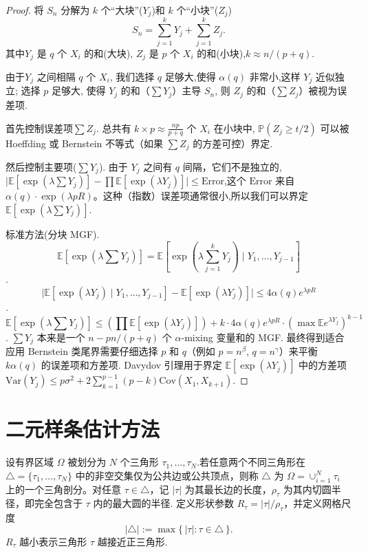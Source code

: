 \documentclass[a4paper,openay,14pt]{ctexbook}
\numberwithin{equation}{section}
\numberwithin{lem}{section}
\begin{document}
\begin{proof}
  
将 $S_n$ 分解为 $k$ 个“大块”($Y_j$)和 $k$ 个“小块”($Z_j$)
    \[
        S_n = \sum_{j=1}^k Y_j + \sum_{j=1}^k Z_j.
    \]
其中$Y_j$ 是 $q$ 个 $X_i$ 的和(大块), $Z_j$ 是 $p$ 个 $X_i$ 的和(小块),$k \approx n/(p+q)$.

由于$Y_j$ 之间相隔 $q$ 个 $X_i$, 我们选择 $q$ 足够大,使得 $\alpha(q)$ 非常小,这样 $Y_j$ 近似独立; 选择 $p$ 足够大, 使得 $Y_j$ 的和（$\sum Y_j$）主导 $S_n$, 则 $Z_j$ 的和（$\sum Z_j$）被视为误差项.

首先控制误差项$\sum Z_j$. 总共有 $k\times p \approx \frac{np}{p+q}$ 个 $X_i$ 在小块中, $\mathbb{P}(Z_j \ge t/2)$ 可以被 Hoeffding 或 Bernstein 不等式（如果 $\sum Z_j$ 的方差可控）界定.

然后控制主要项($\sum Y_j$). 由于 $Y_j$ 之间有 $q$ 间隔，它们不是独立的,$\bigl|\mathbb{E}[\exp(\lambda \sum Y_j)] - \prod \mathbb{E}[\exp(\lambda Y_j)] \bigr| \le \mathrm{Error}$,这个 $\mathrm{Error}$ 来自 $\alpha(q)\cdot \exp(\lambda p R)$。这种（指数）误差项通常很小,所以我们可以界定$\mathbb{E}[\exp(\lambda \sum Y_j)]$.


标准方法(分块 MGF).$$\mathbb{E}[\exp(\lambda \sum Y_j)] = \mathbb{E}[\exp(\lambda \sum_{j=1}^{k} Y_j)\mid Y_1,\ldots,Y_{j-1}]$$. 
$$\bigl|\mathbb{E}[\exp(\lambda Y_j)\mid Y_1,\ldots,Y_{j-1}] - \mathbb{E}[\exp(\lambda Y_j)]\bigr| 
        \le 4\alpha(q)e^{\lambda pR}$$.
         $$\mathbb{E}[\exp(\lambda \sum Y_j)] \le (\prod \mathbb{E}[\exp(\lambda Y_j)]) + k \cdot 4\alpha(q) e^{\lambda pR} \cdot (\max \mathbb{E}e^{\lambda Y_j})^{k-1}$$.
         $\sum Y_j$ 本来是一个 $n-pn/(p+q)$ 个 $\alpha$-mixing 变量和的 MGF.
         最终得到适合应用 Bernstein 类尾界需要仔细选择 $p$ 和 $q$（例如 $p=n^\beta$, $q=n^\gamma$）来平衡 $k\alpha(q)$ 的误差项和方差项. Davydov 引理用于界定 $\mathbb{E}[\exp(\lambda Y_j)]$ 中的方差项 $\mathrm{Var}(Y_j) \le p\sigma^2 + 2\sum_{k=1}^{p-1} (p-k)\mathrm{Cov}(X_1,X_{k+1})$.
 
\end{proof}


\section{二元样条估计方法}\label{BST}

设有界区域 $\Omega$ 被划分为 $N$ 个三角形 $\tau_{1},\ldots,\tau_{N}$.若任意两个不同三角形在 $\triangle=\{\tau_{1},\ldots,\tau_{N}\}$ 中的非空交集仅为公共边或公共顶点，则称 $\triangle$ 为 $\Omega=\cup_{i=1}^N \tau_i$ 上的一个三角剖分。对任意 $\tau\in\triangle$，记 $|\tau|$ 为其最长边的长度，$\rho_\tau$ 为其内切圆半径，即完全包含于 $\tau$ 内的最大圆的半径. 定义形状参数 $R_\tau=|\tau|/\rho_\tau$，并定义网格尺度
\[
|\triangle|:=\max\{\,|\tau|:\tau\in\triangle\,\}.
\]
$R_\tau$ 越小表示三角形 $\tau$ 越接近正三角形.
\end{document}
